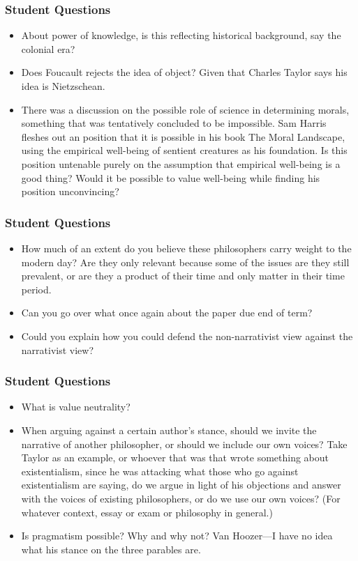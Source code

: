 \documentclass[xcolor=dvipsnames]{beamer}
\begin{document}
\begin{frame}
  \frametitle{Student Questions}
  \begin{itemize}
  \item About power of knowledge, is this reflecting historical
    background, say the colonial era?
  \item Does Foucault rejects the idea of object? Given that Charles
    Taylor says his idea is Nietzschean.
  \item There was a discussion on the possible role of science in
    determining morals, something that was tentatively concluded to be
    impossible. Sam Harris fleshes out an position that it is possible
    in his book The Moral Landscape, using the empirical well-being of
    sentient creatures as his foundation. Is this position untenable
    purely on the assumption that empirical well-being is a good
    thing? Would it be possible to value well-being while finding his
    position unconvincing?
  \end{itemize}
\end{frame}

\begin{frame}
  \frametitle{Student Questions}
  \begin{itemize}
  \item How much of an extent do you believe these philosophers carry
    weight to the modern day? Are they only relevant because some of
    the issues are they still prevalent, or are they a product of
    their time and only matter in their time period.
  \item Can you go over what once again about the paper due end of
    term?
  \item Could you explain how you could defend the non-narrativist
    view against the narrativist view?
  \end{itemize}
\end{frame}

\begin{frame}
  \frametitle{Student Questions}
  \begin{itemize}
  \item What is value neutrality?
  \item When arguing against a certain author's stance, should we
    invite the narrative of another philosopher, or should we include
    our own voices? Take Taylor as an example, or whoever that was
    that wrote something about existentialism, since he was attacking
    what those who go against existentialism are saying, do we argue
    in light of his objections and answer with the voices of existing
    philosophers, or do we use our own voices? (For whatever context,
    essay or exam or philosophy in general.)
  \item Is pragmatism possible? Why and why not? Van Hoozer---I have
    no idea what his stance on the three parables are.
  \end{itemize}
\end{frame}
\end{document}
